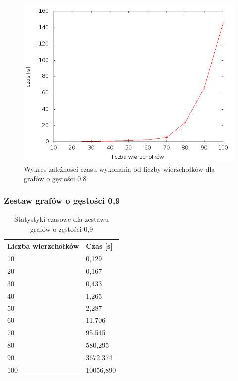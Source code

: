 \documentclass[12pt, a4paper]{article}
\begin{document}
\begin{figure}[h]
    \begin{center}
	\includegraphics[scale=0.5]{results/img/den/den_08.png}
	\caption{Wykres zależności czasu wykonania od liczby wierzchołków dla grafów o gęstości 0,8}
    \end{center}
\end{figure}

\subsubsection*{Zestaw grafów o gęstości 0,9}
\begin{table}[H]
\caption{Statystyki czasowe dla zestawu grafów o gęstości 0,9}
\begin{center}
    \begin{tabular}{|l|l|}
    \hline
    Liczba wierzchołków & Czas [s] \\ \hline
    10 & 0,129 \\ \hline
    20 & 0,167 \\ \hline
    30 & 0,433 \\ \hline
    40 & 1,265 \\ \hline
    50 & 2,287 \\ \hline
    60 & 11,706 \\ \hline
    70 & 95,545 \\ \hline
    80 & 580,295 \\ \hline
    90 & 3672,374 \\ \hline
    100 & 10056,890 \\ \hline
    \end{tabular}
\end{center}
\end{table}
\end{document}
